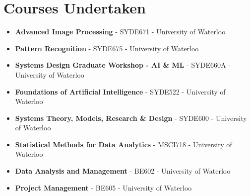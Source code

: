 \documentclass{ExpressiveResume}
\begin{document}

\section{\textcolor{link_blue}{Courses Undertaken}}
\begin{itemize}
\item {\textbf{Advanced Image Processing} - SYDE671 - University of Waterloo}
\item {\textbf{Pattern Recognition} - SYDE675 - University of Waterloo}
\item {\textbf{Systems Design Graduate Workshop - AI \& ML} - SYDE660A - University of Waterloo}
\item {\textbf{Foundations of Artificial Intelligence} - SYDE522 - University of Waterloo}
\item {\textbf{Systems Theory, Models, Research \& Design} - SYDE600 - University of Waterloo}

\item {\textbf{Statistical Methods for Data Analytics} - MSCI718 - University of Waterloo}
\item {\textbf{Data Analysis and Management} - BE602 - University of Waterloo}
\item {\textbf{Project Management} - BE605 - University of Waterloo}
\end{itemize}
\end{document}
